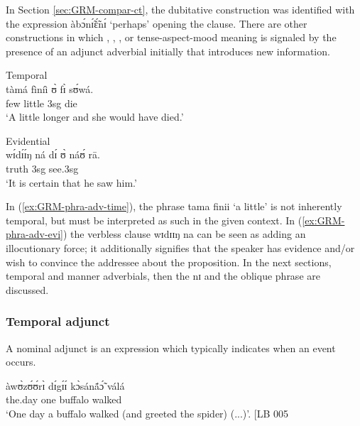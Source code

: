 \begin{exe}
\begin{exe}
\begin{exe}
 In Section \ref{sec:GRM-compar-ct}, the dubitative construction was 
identified with the expression {\sls àbɔ́nɪ̃́ɛ̃́nɪ́}  `perhaps'  opening the 
clause. There are other constructions in which , , , or 
tense-aspect-mood meaning is signaled by the presence of an adjunct adverbial  
initially that introduces new information.  

\ea\label{ex:GRM-phra-adv}

\ea\label{ex:GRM-phra-adv-time}{\rm Temporal}\\
\gll {\ob}tàmá fìníì{\cb} ʊ̀ fɪ̀ sʊ́wá.\\
few little {\sc 3sg} {\mod} die\\
\glt `A little longer and she would  have died.'


\ex\label{ex:GRM-phra-adv-evi}{\rm Evidential}\\
\gll {\ob}wɪ́dɪ́ɪ́ŋ ná{\cb} dɪ́ ʊ̀ náʊ́ rā.\\
truth {\foc} {\comp} {\sc 3sg} see.{\sc 3sg} {\foc}\\
\glt  `It is certain that he saw him.'

\z 
 \z



In (\ref{ex:GRM-phra-adv-time}), the phrase {\sls tama finii} `a little'  is not inherently 
temporal, but must be interpreted as such in the given context. In 
(\ref{ex:GRM-phra-adv-evi}) the verbless clause {\sls wɪdɪɪŋ na}  can be seen as 
adding an illocutionary force; it additionally signifies that the speaker has 
evidence and/or wish to convince the addressee about the proposition. In the  
next sections,  temporal and manner adverbials, then the  {\sls nɪ} 
and the oblique phrase are discussed.


% 

\subsubsection{Temporal  adjunct}
\label{sec:GRM-temporal-adjunct}


A  nominal adjunct   is an expression which typically indicates when  an event occurs.

\ea\label{ex:GRM-adj-temp-adv}

\ea\label{ex:GRM-adj-temp-adv-LB5}
\gll {\ob}àwʊ̀zʊ́ʊ́rɪ̀  dɪ́gɪ́ɪ́{\cb}     kɔ̀sánã́ɔ̃́   válá \\
the.day one    buffalo walked \\
\glt `One day a buffalo walked (and greeted the spider) (...)'. [LB 005


\end{exe}
\end{exe}
\end{exe}
